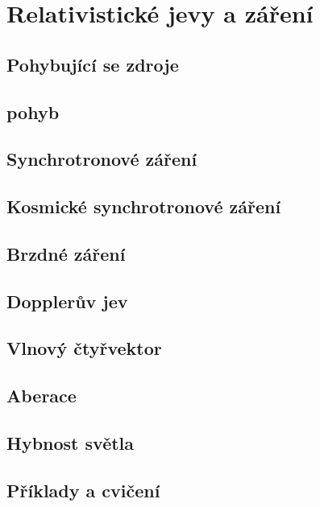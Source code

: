 \chapter{Relativistické jevy a záření}\label{fyz:IchapXXXIV}
\minitoc
  \section{Pohybující se zdroje}\label{fyz:IchappXXXIVsecI}
  \section{ pohyb}\label{fyz:IchappXXXIVsecII}
  \section{Synchrotronové záření}\label{fyz:IchappXXXIVsecIII}
  \section{Kosmické synchrotronové záření}\label{fyz:IchappXXXIVsecIV}
  \section{Brzdné záření}\label{fyz:IchappXXXIVsecV}
  \section{Dopplerův jev}\label{fyz:IchappXXXIVsecVI}
  \section{Vlnový čtyřvektor}\label{fyz:IchappXXXIVsecVII}
  \section{Aberace}\label{fyz:IchappXXXIVsecVIII}
  \section{Hybnost světla}\label{fyz:IchappXXXIVsecIX}
  \section{Příklady a cvičení}\label{fyz:IchappXXXIVsecX}